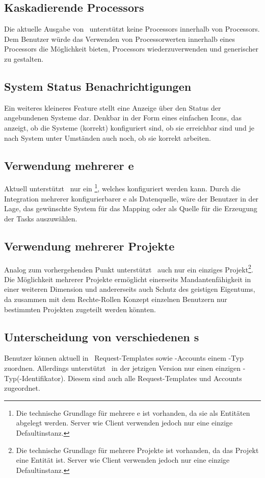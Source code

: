 			
		\subsection{Kaskadierende Processors}
			Die aktuelle Ausgabe von \eeppi\ unterstützt keine Processors innerhalb von Processors.
			Dem Benutzer würde das Verwenden von Processorwerten innerhalb eines Processors die Möglichkeit bieten, Processors wiederzuverwenden und generischer zu gestalten.
			
			
		\subsection{System Status Benachrichtigungen}
			Ein weiteres kleineres Feature stellt eine Anzeige über den Status der angebundenen Systeme dar.
			Denkbar in der Form eines einfachen Icons, das anzeigt, 
			ob die Systeme (korrekt) konfiguriert sind, ob sie erreichbar sind
			und je nach System unter Umständen auch noch, ob sie korrekt arbeiten.		
		
		
	
		\subsection{Verwendung mehrerer \dks e}
			Aktuell unterstützt \eeppi\ nur ein \dks\footnote{Die technische Grundlage für mehrere \dks e ist vorhanden, da sie als Entitäten abgelegt werden. Server wie Client verwenden jedoch nur eine einzige Defaultinstanz.}, welches konfiguriert werden kann.
			Durch die Integration mehrerer konfigurierbarer \dks e als Datenquelle, wäre der Benutzer in der Lage, das gewünschte System für das Mapping oder als Quelle für die Erzeugung der Tasks auszuwählen.
		
		\subsection{Verwendung mehrerer Projekte}
			Analog zum vorhergehenden Punkt unterstützt \eeppi\ auch nur ein einziges Projekt\footnote{Die technische Grundlage für mehrere Projekte ist vorhanden, da das Projekt eine Entität ist. Server wie Client verwenden jedoch nur eine einzige Defaultinstanz.}.
			Die Möglichkeit mehrerer Projekte ermöglicht einerseits Mandantenfähigkeit in einer weiteren Dimension und andererseits auch Schutz des geistigen Eigentums, 
			da zusammen mit dem Rechte-Rollen Konzept einzelnen Benutzern nur bestimmten Projekten zugeteilt werden könnten.


		\subsection{Unterscheidung von verschiedenen \ppt s}
			Benutzer können aktuell in \eeppi\ Request-Templates sowie \ppt-Accounts einem \ppt-Typ zuordnen.
			Allerdings unterstützt \eeppi\ in der jetzigen Version nur einen einzigen \ppt-Typ(-Identifikator).
			Diesem sind auch alle Request-Templates und Accounts zugeordnet.
			
